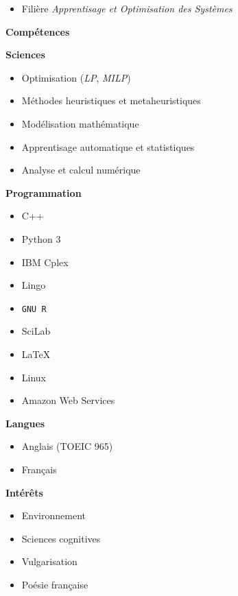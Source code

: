 \documentclass[11.5pt]{article}
\newlength\cvRightWidth
\newcommand\cvSection[1]{
    \begin{mdframed}[
        linewidth=.5pt,
        topline=false,
        leftline=false,
        rightline=false,
        linecolor=red!60!black,
        innermargin=0,
        outermargin=0
    ]
        \begin{Large}
            \textbf{#1}
        \end{Large}
    \end{mdframed}
}
\begin{document}
\begin{minipage}[t]{\textwidth}
\begin{minipage}[t]{\cvRightWidth}
{\begin{itemize}
                    \item Filière \textit{Apprentisage et Optimisation des Systèmes}
                \end{itemize}
            }
            \cvSection{Compétences}
            \textbf{Sciences}
                \vspace{10pt}
                \begin{itemize}
                    \item Optimisation {\small (\emph{LP}, \emph{MILP})}
                    \item Méthodes heuristiques et metaheuristiques
                    \item Modélisation mathématique
                    \item Apprentisage automatique et statistiques
                    \item Analyse et calcul numérique
                \end{itemize}
                \vspace{10pt}
            \textbf{Programmation}
            \begin{multicols}{2}
                \begin{itemize}
                    \item C++
                    \item Python 3
                    \item IBM Cplex
                    \item Lingo
                    \item\texttt{GNU R}
                    \item SciLab
                    \item\LaTeX
                    \item Linux
                    \item Amazon Web Services
                \end{itemize}
            \end{multicols}
            \textbf{Langues}
            \begin{multicols}{2}
                \begin{itemize}
                    \item Anglais {\footnotesize(TOEIC 965)}
                    \item Français
                \end{itemize}
            \end{multicols}
            \textbf{Intérêts}
            \begin{multicols}{2}
                \begin{itemize}
                    \item Environnement
                    \item Sciences cognitives
                    \item Vulgarisation
                    \item Poésie française
                \end{itemize}
            \end{multicols}
        \end{minipage}
    \end{minipage}
\end{document}
